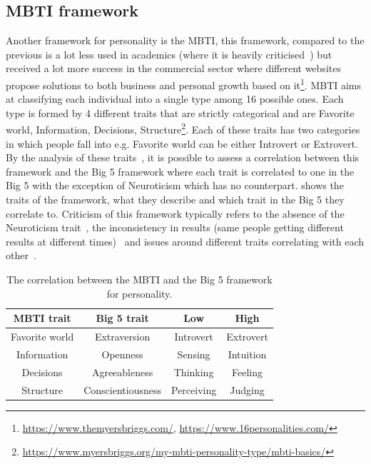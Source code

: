 \documentclass[nomenclature, english, biblatex]{kththesis}
\begin{document}
\subsection{MBTI framework}
Another framework for personality is the \gls{MBTI}, this framework, compared to the previous is a lot less used in academics (where it is heavily criticised~\cite{grant2013goodbye, pittenger1993measuring, harvey1996reliability, sipps1985item, mccrae1989reinterpreting}) but received a lot more success in the commercial sector where different websites propose solutions to both business and personal growth based on it\footnote{\url{https://www.themyersbriggs.com/}, \url{https://www.16personalities.com/}}. \Gls{MBTI} aims at classifying each individual into a single type among 16 possible ones. Each type is formed by 4 different traits that are strictly categorical and are Favorite world, Information, Decisions, Structure\footnote{\url{https://www.myersbriggs.org/my-mbti-personality-type/mbti-basics/}}. Each of these traits has two categories in which people fall into e.g. Favorite world can be either Introvert or Extrovert. By the analysis of these traits~\cite{mccrae1989reinterpreting}, it is possible to assess a correlation between this framework and the Big 5 framework where each trait is correlated to one in the Big 5 with the exception of Neuroticism which has no counterpart.  shows the traits of the framework, what they describe and which trait in the Big 5 they correlate to. Criticism of this framework typically refers to the absence of the Neuroticism trait~\cite{grant2013goodbye, pittenger1993measuring}, the inconsistency in results (same people getting different results at different times)~\cite{harvey1996reliability} and issues around different traits correlating with each other~\cite{sipps1985item, mccrae1989reinterpreting}.
\begin{table}
    \centering
    \begin{adjustbox}{max width=\textwidth}
    \begin{tabular}{|c|c|c|c|}
        \hline
        MBTI trait & Big 5 trait & Low & High\\
        \hline
        \hline 
        Favorite world & Extraversion & Introvert & Extrovert \\
        \hline  
        Information & Openness & Sensing & Intuition\\
        \hline  
        Decisions & Agreeableness & Thinking & Feeling\\
        \hline  
        Structure & Conscientiousness & Perceiving & Judging\\
        \hline 
    \end{tabular}
    \end{adjustbox}
    \caption{The correlation between the MBTI and the Big 5 framework for personality.}
    \label{tab:mbti}
\end{table}
\end{document}

